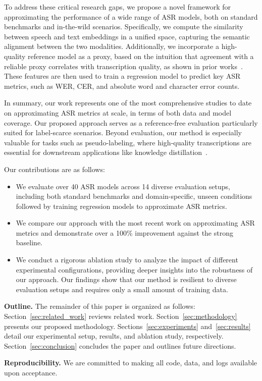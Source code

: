 To address these critical research gaps, we propose a novel framework for approximating the performance of a wide range of ASR models, both on standard benchmarks and in-the-wild scenarios. Specifically, we compute the similarity between speech and text embeddings in a unified space, capturing the semantic alignment between the two modalities. Additionally, we incorporate a high-quality reference model as a proxy, based on the intuition that agreement with a reliable proxy correlates with transcription quality, as shown in prior works~\cite{waheed2025udistilwhisperlabelfreedatafiltering}. These features are then used to train a regression model to predict key ASR metrics, such as WER, CER, and absolute word and character error counts.

In summary, our work represents one of the most comprehensive studies to date on approximating ASR metrics at scale, in terms of both data and model coverage. Our proposed approach serves as a reference-free evaluation particularly suited for label-scarce scenarios. Beyond evaluation, our method is especially valuable for tasks such as pseudo-labeling, where high-quality transcriptions are essential for downstream applications like knowledge distillation~\cite{waheed-etal-2024-distill, gandhi2023distilwhisper}.

Our contributions are as follows:
\begin{itemize}
    \item We evaluate over 40 ASR models across 14 diverse evaluation setups, including both standard benchmarks and domain-specific, unseen conditions followed by training regression models to approximate ASR metrics.
    \item We compare our approach with the most recent work on approximating ASR metrics and demonstrate over a 100\% improvement against the strong baseline.
    \item We conduct a rigorous ablation study to analyze the impact of different experimental configurations, providing deeper insights into the robustness of our approach. Our findings show that our method is resilient to diverse evaluation setups and requires only a small amount of training data.
\end{itemize}

\noindent\textbf{Outline.} The remainder of this paper is organized as follows: Section~\ref{sec:related_work} reviews related work. Section~\ref{sec:methodology} presents our proposed methodology. Sections~\ref{sec:experiments} and~\ref{sec:results} detail our experimental setup, results, and ablation study, respectively. Section~\ref{sec:conclusion} concludes the paper and outlines future directions.

\noindent\textbf{Reproducibility.} We are committed to making all code, data, and logs available upon acceptance.
